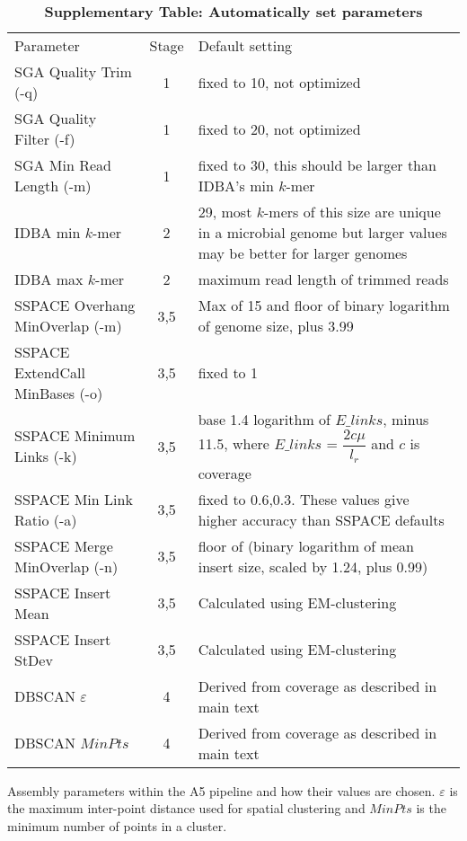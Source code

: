 \documentclass[10pt]{article}
\begin{document}
\begin{table}[hp]
\caption{\bf{Supplementary Table: Automatically set parameters}}
\footnotesize
{\begin{tabular}{l|c|l}
Parameter                       & Stage & Default setting  \\
SGA Quality Trim (-q)           & 1     & fixed to 10, not optimized \\
SGA Quality Filter (-f)         & 1     & fixed to 20, not optimized \\
SGA Min Read Length (-m)        & 1     & fixed to 30, this should be larger than IDBA's min $k$-mer \\
IDBA min $k$-mer                & 2     & 29, most $k$-mers of this size are unique in a microbial genome but larger values may be better for larger genomes \\
IDBA max $k$-mer                & 2     & maximum read length of trimmed reads \\
SSPACE Overhang MinOverlap (-m) & 3,5   & Max of 15 and floor of binary logarithm of genome size, plus 3.99  \\
SSPACE ExtendCall MinBases (-o) & 3,5   & fixed to 1 \\
SSPACE Minimum Links (-k)       & 3,5   & base 1.4 logarithm of $E\_links$, minus 11.5, where $E\_links$ = $\dfrac{2c\mu}{l_r}$ and $c$ is coverage \\
SSPACE Min Link Ratio (-a)      & 3,5   & fixed to 0.6,0.3. These values give higher accuracy than SSPACE defaults  \\
SSPACE Merge MinOverlap (-n)    & 3,5   & floor of (binary logarithm of mean insert size, scaled by 1.24, plus 0.99) \\
SSPACE Insert Mean 	        & 3,5   & Calculated using EM-clustering \\
SSPACE Insert StDev             & 3,5   & Calculated using EM-clustering \\
DBSCAN $\varepsilon$            & 4     & Derived from coverage as described in main text \\
DBSCAN $MinPts$                 & 4     & Derived from coverage as described in main text \\
\end{tabular}}
\begin{flushleft} Assembly parameters within the A5 pipeline and how their values are chosen. $\varepsilon$ is the maximum inter-point distance 
used for spatial clustering and $MinPts$ is the minimum number of points in a cluster.
\end{flushleft}
\label{tab:tab03}
\end{table}
\end{document}
